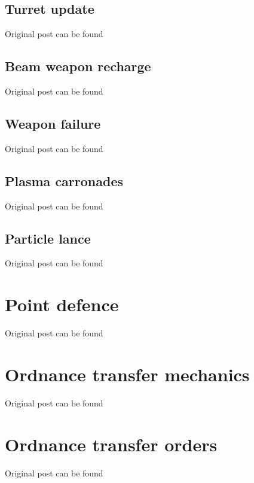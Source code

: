 \documentclass[10pt,a4paper,oneside]{article}
\begin{document}
\subsection{Turret update}
Original post can be found

\subsection{Beam weapon recharge}
Original post can be found

\subsection{Weapon failure}
Original post can be found

\subsection{Plasma carronades}
Original post can be found

\subsection{Particle lance}
Original post can be found


\section{Point defence}
Original post can be found

\section{Ordnance transfer mechanics}
Original post can be found

\section{Ordnance transfer orders}
Original post can be found
\end{document}
